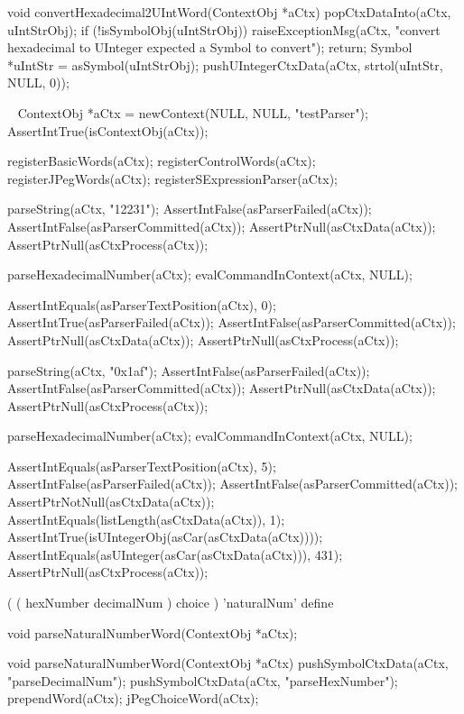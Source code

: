 void convertHexadecimal2UIntWord(ContextObj *aCtx) {
  popCtxDataInto(aCtx, uIntStrObj);
  if (!isSymbolObj(uIntStrObj)) {
    raiseExceptionMsg(aCtx,
      "convert hexadecimal to UInteger expected a Symbol to convert");
    return;
  }
  Symbol *uIntStr = asSymbol(uIntStrObj);  
  pushUIntegerCtxData(aCtx, strtol(uIntStr, NULL, 0));  
}
\stopCCode

\CTestsSuiteSetup\
\startCTest
  ContextObj *aCtx = newContext(NULL, NULL, "testParser");
  AssertIntTrue(isContextObj(aCtx));
  
  registerBasicWords(aCtx);
  registerControlWords(aCtx);
  registerJPegWords(aCtx);
  registerSExpressionParser(aCtx);
\stopCTest

\startCTest
  parseString(aCtx, "12231");
  AssertIntFalse(asParserFailed(aCtx));
  AssertIntFalse(asParserCommitted(aCtx));
  AssertPtrNull(asCtxData(aCtx));
  AssertPtrNull(asCtxProcess(aCtx));
  
  parseHexadecimalNumber(aCtx);
  evalCommandInContext(aCtx, NULL);
  
  AssertIntEquals(asParserTextPosition(aCtx), 0);
  AssertIntTrue(asParserFailed(aCtx));
  AssertIntFalse(asParserCommitted(aCtx));
  AssertPtrNull(asCtxData(aCtx));
  AssertPtrNull(asCtxProcess(aCtx));
\stopCTest
\stopTestCase

\startCTest
  parseString(aCtx, "0x1af");
  AssertIntFalse(asParserFailed(aCtx));
  AssertIntFalse(asParserCommitted(aCtx));
  AssertPtrNull(asCtxData(aCtx));
  AssertPtrNull(asCtxProcess(aCtx));
  
  parseHexadecimalNumber(aCtx);
  evalCommandInContext(aCtx, NULL);
  
  AssertIntEquals(asParserTextPosition(aCtx), 5);
  AssertIntFalse(asParserFailed(aCtx));
  AssertIntFalse(asParserCommitted(aCtx));
  AssertPtrNotNull(asCtxData(aCtx));
  AssertIntEquals(listLength(asCtxData(aCtx)), 1);
  AssertIntTrue(isUIntegerObj(asCar(asCtxData(aCtx))));
  AssertIntEquals(asUInteger(asCar(asCtxData(aCtx))), 431);  
  AssertPtrNull(asCtxProcess(aCtx));
\stopCTest
\stopTestCase
\stopTestSuite

\startTestSuite[parseNaturalNumberWord]

\starttyping
(
  ( hexNumber decimalNum ) choice
) 'naturalNum' define
\stoptyping

\startCHeader
void parseNaturalNumberWord(ContextObj *aCtx);
\stopCHeader

\startCCode
void parseNaturalNumberWord(ContextObj *aCtx) {
  pushSymbolCtxData(aCtx, "parseDecimalNum");
  pushSymbolCtxData(aCtx, "parseHexNumber");
  prependWord(aCtx);
  jPegChoiceWord(aCtx);
}
\stopCCode

